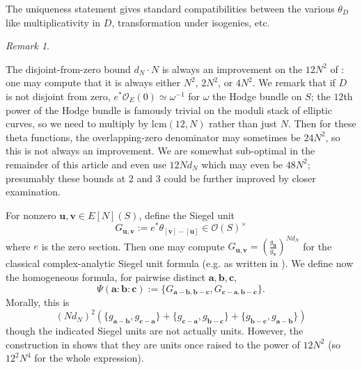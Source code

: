 \documentclass[a4paper,reqno,11pt]{amsart}
\theoremstyle{plain}
\theoremstyle{definition}
\theoremstyle{remark}
\newtheorem{remarkwr}[theorem]{Remark}
\newenvironment{remark}{\begin{remarkwr}\begin{upshape}}{\end{upshape}\end{remarkwr}}
\begin{document}
The uniqueness statement gives standard compatibilities between the various $\theta_D$ like multiplicativity in $D$, transformation under isogenies, etc.

\begin{remark} \label{rem:12}
     The disjoint-from-zero bound $d_N \cdot N$ is always an improvement on the $12N^2$ of \cite{BPPS}: one may compute that it is always either $N^2$, $2N^2$, or $4N^2$. We remark that if $D$ is not disjoint from zero, $e^*\mathcal O_E(0)\simeq\omega^{-1}$ for $\omega$ the Hodge bundle on $S$; the $12$th power of the Hodge bundle is famously trivial on the moduli stack of elliptic curves, so we need to multiply by $\mathrm{lcm}(12,N)$ rather than just $N$. Then for these theta functions, the overlapping-zero denominator may sometimes be $24N^2$, so this is not always an improvement. We are somewhat sub-optimal in the remainder of this article and even use $12N d_N$ which may even be $48N^2$; presumably these bounds at $2$ and $3$ could be further improved by closer examination.
\end{remark}

For nonzero $\mathbf{u},\mathbf{v}\in E[N](S)$, define the Siegel unit
\[
G_{\mathbf{u},\mathbf{v}}
:=
e^*\theta_{[\mathbf{v}]-[\mathbf{u}]}\in\mathcal O(S)^\times
\]
where $e$ is the zero section. Then one may compute $G_{\mathbf{u},\mathbf{v}}= 
(\frac{g_{\mathbf u}}{g_{\mathbf v}})^{Nd_N}$ for the classical complex-analytic Siegel unit formula (e.g. as written in \cite[Definition 1.1.1]{BPPS}). We define now the homogeneous formula, for pairwise distinct $\mathbf{a},\mathbf{b},\mathbf{c}$,
\[
\Psi(\mathbf{a}:\mathbf{b}:\mathbf{c}):=\{G_{\mathbf{a-b},\mathbf{b-c}},G_{\mathbf{c-a},\mathbf{b-c}}\}.
\]
Morally, this is
\[(Nd_N)^2(
\{g_{\mathbf a-\mathbf b},
g_{\mathbf c-\mathbf a}\}
+
\{g_{\mathbf c-\mathbf a},
g_{\mathbf b-\mathbf c}\}
+
\{g_{\mathbf b-\mathbf c},
g_{\mathbf a-\mathbf b}\})\]
though the indicated Siegel units are not actually units. However, the construction in \cite{BPPS} shows that they are units once raised to the power of $12N^2$ (so $12^2 N^4$ for the whole expression).
\end{document}
